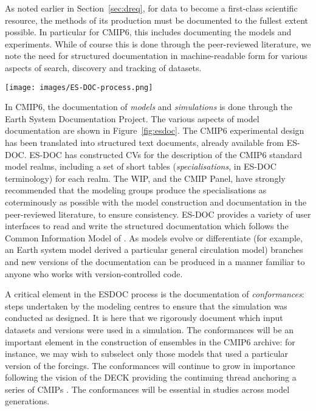 \documentclass[gmd,manuscript]{copernicus}
\newcommand{\bibref}[1] { \cite{ref:#1}}
\newcommand{\figref}[1] {\mbox{Figure   \ref{fig:#1}}}
\newcommand{\secref}[1] {\mbox{Section  \ref{sec:#1}}}
\begin{document}
As noted earlier in \secref{dreq}, for data to become a first-class
scientific resource, the methods of its production must be documented
to the fullest extent possible. In particular for CMIP6, this includes
documenting the models and experiments. While of course this is done
through the peer-reviewed literature, we note the need for structured
documentation in machine-readable form for various aspects of search,
discovery and tracking of datasets. 


\begin{figure*}
  \begin{center}
    \texttt{[image: images/ES-DOC-process.png]}
  \end{center}
  \caption{Flowchart of ES-DOC documentation process, delineating
    sequence of events and indicating the parties responsible for
    producing the documentation. Figure courtesy Eric Guilyardi and
    Mark Greenslade.}
  \label{fig:esdoc}
\end{figure*}

In CMIP6, the documentation of \emph{models} and \emph{simulations} is
done through the Earth System Documentation
\citep[\href{https://goo.gl/WNwKD9}{ES-DOC},][]{ref:guilyardietal2013}
Project. The various aspects of model documentation are shown in
\figref{esdoc}. The CMIP6 experimental design has been translated into
structured text documents, already available from ES-DOC. ES-DOC has
constructed CVs for the description of the CMIP6 standard model
realms, including a set of short tables (\emph{specialisations}, in
ES-DOC terminology) for each realm. The WIP, and the CMIP Panel, have
strongly recommended that the modeling groups produce the
specialisations as coterminously as possible with the model
construction and documentation in the peer-reviewed literature, to
ensure consistency. ES-DOC provides a variety of user interfaces to
read and write the structured documentation which follows the Common
Information Model of \bibref{lawrenceetal2012}. As models evolve or
differentiate (for example, an Earth system model derived a particular
general circulation model) branches and new versions of the
documentation can be produced in a manner familiar to anyone who works
with version-controlled code.

A critical element in the ESDOC process is the documentation of
\emph{conformances}: steps undertaken by the modeling centres to
ensure that the simulation was conducted as designed. It is here that
we rigorously document which input datasets and versions \citep[e.g the
forcing datasets, see][]{ref:duracketal2017} were used in a
simulation. The conformances will be an important element in the
construction of ensembles in the CMIP6 archive: for instance, we may
wish to subselect only those models that used a particular version of
the forcings. The conformances will continue to grow in importance
following the vision of the DECK providing the continuing thread
anchoring a series of CMIPs \citep[viz. the well-known Figure~1
of][]{ref:eyringetal2016a}. The conformances will be essential in
studies across model generations.
\end{document}
